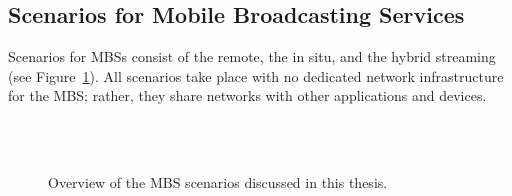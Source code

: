 \subsection{Scenarios for Mobile Broadcasting Services}
\label{sec:220_Scenario}
Scenarios for \ac{MBS}s consist of the remote, the in situ, and the hybrid streaming (see Figure~\ref{fig:520_Scenario_Streaming}).
All scenarios take place with no dedicated network infrastructure for the \ac{MBS}; rather, they share networks with other applications and devices.
\begin{figure}[htb]
	\centering
	\\
	\\
	\caption[Overview of Mobile Broadcasting Services]{Overview of the MBS scenarios discussed in this thesis.}
	\label{fig:520_Scenario_Streaming}
\end{figure}
